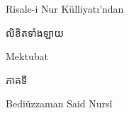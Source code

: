 \documentclass{article}
\begin{document}
\begin{center}
\vspace*{18mm}
{\lat\large Risale-i Nur Külliyatı'ndan\par}
\vspace{22mm}
{\kh\fontsize{40}{52}\selectfont លិខិតទាំងឡាយ\par}
\vspace{6mm}
{\lat\LARGE Mektubat\par}
\vspace{10mm}
{\kh\fontsize{20}{28}\selectfont ភាគទី \vol\par}
\vfill
{\lat\Large Bediüzzaman Said Nursî\par}
\vspace{8mm}
\end{center}
\newpage\null
\end{document}
